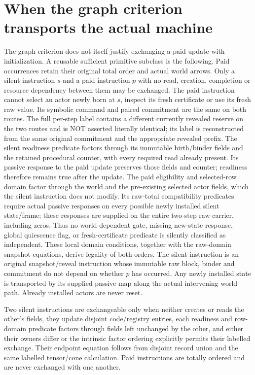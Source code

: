 \documentclass{article}
\begin{document}
\section{When the graph criterion transports the actual machine}
The graph criterion does not itself justify exchanging a paid update with initialization. A reusable sufficient primitive subclass is the following. Paid occurrences retain their original total order and actual world arrows. Only a silent instruction $s$ and a paid instruction $p$ with no read, creation, completion or resource dependency between them may be exchanged. The paid instruction cannot select an actor newly born at $s$, inspect its fresh certificate or use its fresh raw value. Its symbolic command and paired commitment are the same on both routes. The full per-step label contains a different currently revealed reserve on the two routes and is NOT asserted literally identical; its label is reconstructed from the same original commitment and the appropriate revealed prefix. The silent readiness predicate factors through its immutable birth/binder fields and the retained procedural counter, with every required read already present. Its passive response to the paid update preserves those fields and counter; readiness therefore remains true after the update. The paid eligibility and selected-row domain factor through the world and the pre-existing selected actor fields, which the silent instruction does not modify. Its raw-total compatibility predicates require actual passive responses on every possible newly installed silent state/frame; these responses are supplied on the entire two-step raw carrier, including zeros. Thus no world-dependent gate, missing new-state response, global quiescence flag, or fresh-certificate predicate is silently classified as independent. These local domain conditions, together with the raw-domain snapshot equations, derive legality of both orders. The silent instruction is an original snapshot/reveal instruction whose immutable raw block, binder and commitment do not depend on whether $p$ has occurred. Any newly installed state is transported by its supplied passive map along the actual intervening world path. Already installed actors are never reset.

Two silent instructions are exchangeable only when neither creates or reads the other's fields, they update disjoint code/registry entries, each readiness and row-domain predicate factors through fields left unchanged by the other, and either their owners differ or the intrinsic factor ordering explicitly permits their labelled exchange. Their endpoint equation follows from disjoint record union and the same labelled tensor/cone calculation. Paid instructions are totally ordered and are never exchanged with one another.
\end{document}
